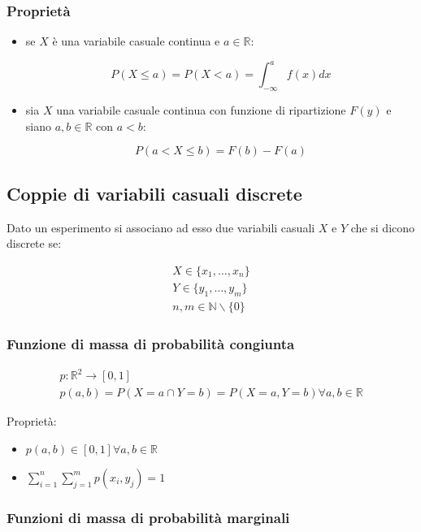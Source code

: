 \documentclass{subfiles}
\begin{document}
\subsubsection{Proprietà}

\begin{itemize}
    \item se $X$ è una variabile casuale continua e $a \in \mathbb{R}$:

    $$
    P(X \leq a) = P(X < a) = \int^a_{-\infty}f(x)dx
    $$

    \item sia $X$ una variabile casuale continua con funzione di ripartizione $F(y)$ e siano $a,b \in \mathbb{R}$ con $a < b$:

    $$
    P(a < X \leq b) = F(b) - F(a)
    $$
\end{itemize}

\subsection{Coppie di variabili casuali discrete}

Dato un esperimento si associano ad esso due variabili casuali $X$ e $Y$ che si dicono discrete se:

$$
\begin{matrix}
X \in \{x_1, \dots, x_n\} \\
Y \in \{y_1, \dots, y_m\} \\
n,m \in \mathbb{N} \backslash \{0\}
\end{matrix}
$$

\subsubsection{Funzione di massa di probabilità congiunta}

$$
\begin{matrix}
p:\mathbb{R}^2 \to [0,1] \\
p(a,b) = P(X=a \cap Y=b) = P(X=a, Y=b) \forall a,b \in \mathbb{R}
\end{matrix}
$$

\noindent
Proprietà:

\begin{itemize}
    \item $p(a,b) \in [0,1] \forall a,b \in \mathbb{R}$
    \item $\sum^n_{i=1} \sum^m_{j=1} p(x_i, y_j) = 1$
\end{itemize}

\subsubsection{Funzioni di massa di probabilità marginali}
\end{document}
